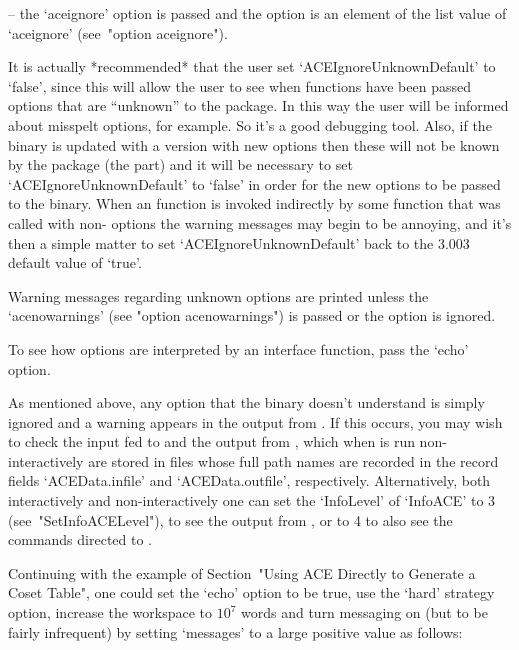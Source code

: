 \item{--} the `aceignore' option  is  passed  and  the  option  is  an
element of the list value of `aceignore' (see~"option aceignore").

\endlist

It    is    actually    *recommended*    that     the     user     set
`ACEIgnoreUnknownDefault' to `false', since this will allow  the  user
to see when  {\ACE}  functions  have  been  passed  options  that  are
``unknown'' to the {\ACE} package.  In  this  way  the  user  will  be
informed about misspelt options, for example. So it's a good debugging
tool. Also, if the {\ACE} binary is updated with a  version  with  new
options then these will not be known by the package (the {\GAP}  part)
and it will be necessary to set `ACEIgnoreUnknownDefault'  to  `false'
in order for the new options to be  passed  to  the  binary.  When  an
{\ACE} function is invoked indirectly by some function that was called
with non-{\ACE} options the warning messages may begin to be annoying,
and it's then a simple matter to set `ACEIgnoreUnknownDefault' back to
the {\ACE} 3.003 default value of `true'.

Warning messages regarding unknown  options  are  printed  unless  the
`acenowarnings' (see "option acenowarnings") is passed or  the  option
is ignored.

To see how options are interpreted by an  {\ACE}  interface  function,
pass the `echo' option.

As  mentioned  above,  any  option  that  the  {\ACE}  binary  doesn't
understand is simply ignored and a warning appears in the output  from
{\ACE}. If this occurs, you may wish to check the input fed to  {\ACE}
and the output from {\ACE}, which when {\ACE} is run non-interactively
are stored in files whose full path names are recorded in  the  record
fields   `ACEData.infile'   and    `ACEData.outfile',    respectively.
Alternatively, both interactively and non-interactively  one  can  set
the `InfoLevel' of `InfoACE' to 3 (see~"SetInfoACELevel"), to see  the
output from {\ACE}, or to 4 to  also  see  the  commands  directed  to
{\ACE}.


Continuing with the example of Section~"Using ACE Directly to Generate
a Coset Table", one could set the `echo' option to be  true,  use  the
`hard' strategy option, increase the workspace  to  $10^7$  words  and
turn messaging on (but to be fairly infrequent) by setting  `messages'
to a large positive value as follows:

